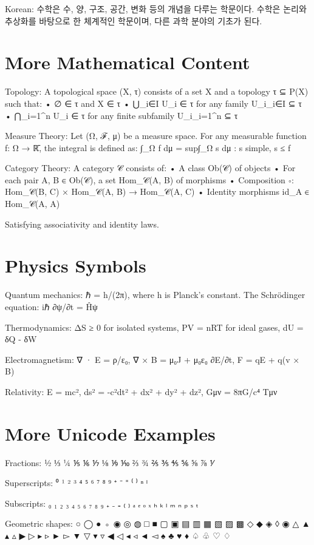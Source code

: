 \documentclass[12pt]{article}
\begin{document}
Korean: 수학은 수, 양, 구조, 공간, 변화 등의 개념을 다루는 학문이다. 수학은 논리와 추상화를 바탕으로 한 체계적인 학문이며, 다른 과학 분야의 기초가 된다.

\section{More Mathematical Content}

Topology: A topological space (X, τ) consists of a set X and a topology τ ⊆ P(X) such that:
• ∅ ∈ τ and X ∈ τ
• ⋃_{i∈I} U_i ∈ τ for any family {U_i}_{i∈I} ⊆ τ
• ⋂_{i=1}^n U_i ∈ τ for any finite subfamily {U_i}_{i=1}^n ⊆ τ

Measure Theory: Let (Ω, ℱ, μ) be a measure space. For any measurable function f: Ω → ℝ̄, the integral is defined as:
∫_Ω f dμ = sup{∫_Ω s dμ : s simple, s ≤ f}

Category Theory: A category 𝒞 consists of:
• A class Ob(𝒞) of objects
• For each pair A, B ∈ Ob(𝒞), a set Hom_𝒞(A, B) of morphisms
• Composition ∘: Hom_𝒞(B, C) × Hom_𝒞(A, B) → Hom_𝒞(A, C)
• Identity morphisms id_A ∈ Hom_𝒞(A, A)

Satisfying associativity and identity laws.

\section{Physics Symbols}

Quantum mechanics: ℏ = h/(2π), where h is Planck's constant. The Schrödinger equation: iℏ ∂ψ/∂t = Ĥψ

Thermodynamics: ΔS ≥ 0 for isolated systems, PV = nRT for ideal gases, dU = δQ - δW

Electromagnetism: ∇ · E = ρ/ε₀, ∇ × B = μ₀J + μ₀ε₀ ∂E/∂t, F = qE + q(v × B)

Relativity: E = mc², ds² = -c²dt² + dx² + dy² + dz², Gμν = 8πG/c⁴ Tμν

\section{More Unicode Examples}

Fractions: ½ ⅓ ¼ ⅕ ⅙ ⅐ ⅛ ⅑ ⅒ ⅔ ¾ ⅖ ⅗ ⅘ ⅚ ⅝ ⅞ ⅟

Superscripts: ⁰ ¹ ² ³ ⁴ ⁵ ⁶ ⁷ ⁸ ⁹ ⁺ ⁻ ⁼ ⁽ ⁾ ⁿ ⁱ

Subscripts: ₀ ₁ ₂ ₃ ₄ ₅ ₆ ₇ ₈ ₉ ₊ ₋ ₌ ₍ ₎ ₐ ₑ ₒ ₓ ₕ ₖ ₗ ₘ ₙ ₚ ₛ ₜ

Geometric shapes: ○ ◯ ● ◦ ◉ ◎ ◍ □ ■ ▢ ▣ ▤ ▥ ▦ ▧ ▨ ▩ ◇ ◆ ◈ ◊ ◉ △ ▲ ▴ ▵ ▶ ▷ ▸ ▹ ► ▻ ▼ ▽ ▾ ▿ ◀ ◁ ◂ ◃ ◄ ◅ ♠ ♣ ♥ ♦ ♤ ♧ ♡ ♢
\end{document}
